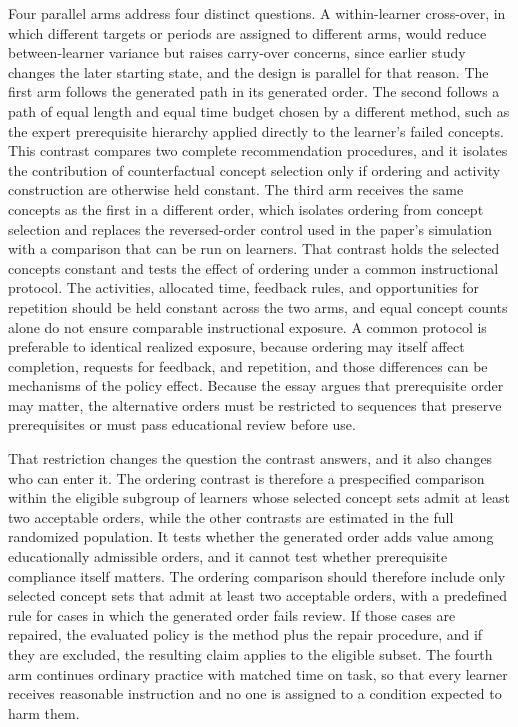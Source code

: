 \documentclass[11pt]{article}
\begin{document}
Four parallel arms address four distinct questions. A within-learner cross-over, in which different targets or periods are assigned to different arms, would reduce between-learner variance but raises carry-over concerns, since earlier study changes the later starting state, and the design is parallel for that reason. The first arm follows the generated path in its generated order. The second follows a path of equal length and equal time budget chosen by a different method, such as the expert prerequisite hierarchy applied directly to the learner's failed concepts. This contrast compares two complete recommendation procedures, and it isolates the contribution of counterfactual concept selection only if ordering and activity construction are otherwise held constant. The third arm receives the same concepts as the first in a different order, which isolates ordering from concept selection and replaces the reversed-order control used in the paper's simulation with a comparison that can be run on learners. That contrast holds the selected concepts constant and tests the effect of ordering under a common instructional protocol. The activities, allocated time, feedback rules, and opportunities for repetition should be held constant across the two arms, and equal concept counts alone do not ensure comparable instructional exposure. A common protocol is preferable to identical realized exposure, because ordering may itself affect completion, requests for feedback, and repetition, and those differences can be mechanisms of the policy effect. Because the essay argues that prerequisite order may matter, the alternative orders must be restricted to sequences that preserve prerequisites or must pass educational review before use. 

That restriction changes the question the contrast answers, and it also changes who can enter it. The ordering contrast is therefore a prespecified comparison within the eligible subgroup of learners whose selected concept sets admit at least two acceptable orders, while the other contrasts are estimated in the full randomized population. It tests whether the generated order adds value among educationally admissible orders, and it cannot test whether prerequisite compliance itself matters. The ordering comparison should therefore include only selected concept sets that admit at least two acceptable orders, with a predefined rule for cases in which the generated order fails review. If those cases are repaired, the evaluated policy is the method plus the repair procedure, and if they are excluded, the resulting claim applies to the eligible subset. The fourth arm continues ordinary practice with matched time on task, so that every learner receives reasonable instruction and no one is assigned to a condition expected to harm them.
\end{document}
